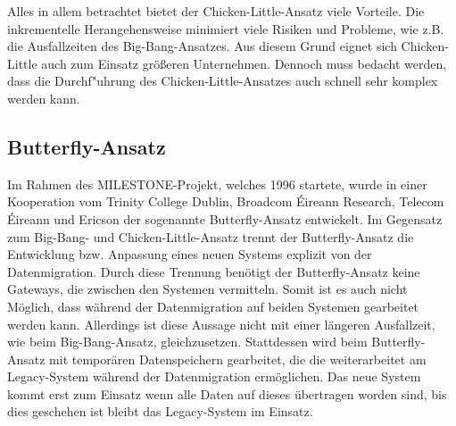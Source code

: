 \lb
Alles in allem betrachtet bietet der Chicken-Little-Ansatz viele Vorteile. Die inkrementelle Herangehensweise minimiert viele Risiken und Probleme, wie z.B. die Ausfallzeiten des Big-Bang-Ansatzes. Aus diesem Grund eignet sich Chicken-Little auch zum Einsatz größeren Unternehmen. Dennoch muss bedacht werden, dass die Durchf"uhrung des Chicken-Little-Ansatzes auch schnell sehr komplex werden kann.

\subsection{Butterfly-Ansatz}



Im Rahmen des MILESTONE-Projekt, welches 1996 startete, wurde in einer Kooperation vom Trinity College Dublin, Broadcom \'{E}ireann Research, Telecom \'{E}ireann und Ericson der sogenannte Butterfly-Ansatz entwickelt.\citep[S. 202]{wuLawlessBisbal-1997} Im Gegensatz zum Big-Bang- und Chicken-Little-Ansatz trennt der Butterfly-Ansatz die Entwicklung bzw. Anpassung eines neuen Systems explizit von der Datenmigration. Durch diese Trennung benötigt der Butterfly-Ansatz keine Gateways, die zwischen den Systemen vermitteln.\citep[S. 202]{wuLawlessBisbal-1997} Somit ist es auch nicht Möglich, dass während der Datenmigration auf beiden Systemen gearbeitet werden kann. Allerdings ist diese Aussage nicht mit einer längeren Ausfallzeit, wie beim Big-Bang-Ansatz, gleichzusetzen. Stattdessen wird beim Butterfly-Ansatz mit temporären Datenspeichern gearbeitet, die die weiterarbeitet am Legacy-System während der Datenmigration ermöglichen. Das neue System kommt erst zum Einsatz wenn alle Daten auf dieses übertragen worden sind, bis dies geschehen ist bleibt das Legacy-System im Einsatz.\citep[S. 3]{wuLawless-1997}
\lb

